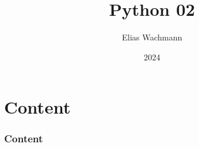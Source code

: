 \documentclass{beamer}
\title[]
{Python 02}
\author[E.~Wachmann]{\scriptsize Elias Wachmann
}
\date{2024} %
\institute[Institute of Theoretical and Computational Physics]
{
}
\begin{document}
\titleframe


\section*{Content}

\begin{frame}
\frametitle{Content}
  \tableofcontents
\end{frame}
\end{document}
